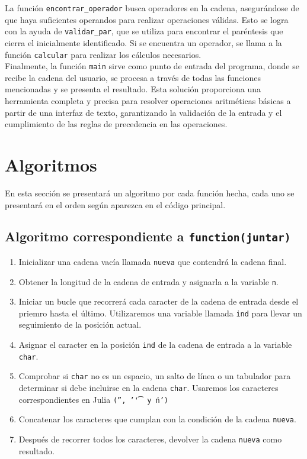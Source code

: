 \documentclass{article}
\begin{document}
La función \texttt{encontrar_operador} busca operadores en la cadena, asegurándose de que haya suficientes operandos para realizar operaciones válidas. Esto se logra con la ayuda de \texttt{validar_par}, que se utiliza para encontrar el paréntesis que cierra el inicialmente identificado. Si se encuentra un operador, se llama a la función \texttt{calcular} para realizar los cálculos necesarios.\\

Finalmente, la función \texttt{main} sirve como punto de entrada del programa, donde se recibe la cadena del usuario, se procesa a través de todas las funciones mencionadas y se presenta el resultado. Esta solución proporciona una herramienta completa y precisa para resolver operaciones aritméticas básicas a partir de una interfaz de texto, garantizando la validación de la entrada y el cumplimiento de las reglas de precedencia en las operaciones.\\


\section{Algoritmos}
En esta sección se presentará un algoritmo por cada función hecha, cada uno se presentará en el orden según aparezca en el código principal.

\subsection{Algoritmo correspondiente a \texttt{function(juntar)}}
\begin{enumerate}
    \item Inicializar una cadena vacía llamada \texttt{nueva} que contendrá la cadena final.

    \item Obtener la longitud de la cadena de entrada y asignarla a la variable \texttt{n}.

    \item Iniciar un bucle que recorrerá cada caracter de la cadena de entrada desde el priemro hasta el último. Utilizaremos una variable llamada \texttt{ind} para llevar un seguimiento de la posición actual. 

    \item Asignar el caracter en la posición \texttt{ind} de la cadena de entrada a la variable \texttt{char}.

    \item Comprobar si \texttt{char} no es un espacio, un salto de línea o un tabulador para determinar si debe incluirse en la cadena \texttt{char}. Usaremos los caracteres correspondientes en Julia \texttt{('', '\t' y \'n')}

    \item Concatenar los caracteres que cumplan con la condición de la cadena \texttt{nueva}.

    \item Después de recorrer todos los caracteres, devolver la cadena \texttt{nueva} como resultado.\\
\end{enumerate}
\end{document}
